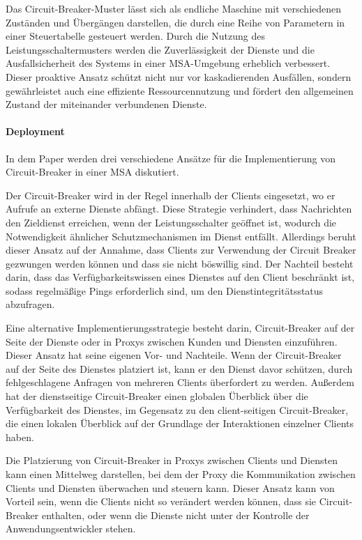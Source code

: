 Das Circuit-Breaker-Muster lässt sich als endliche Maschine mit verschiedenen Zuständen
und Übergängen darstellen, die durch eine Reihe von Parametern in einer Steuertabelle gesteuert werden.
Durch die Nutzung des Leistungsschaltermusters werden die Zuverlässigkeit der Dienste und die
Ausfallsicherheit des Systems in einer MSA-Umgebung erheblich verbessert.
Dieser proaktive Ansatz schützt nicht nur vor kaskadierenden Ausfällen,
sondern gewährleistet auch eine effiziente Ressourcennutzung und fördert den allgemeinen Zustand
der miteinander verbundenen Dienste.


\paragraph{Deployment}

In dem Paper werden drei verschiedene Ansätze für die Implementierung von Circuit-Breaker
in einer MSA diskutiert.

Der Circuit-Breaker wird in der Regel innerhalb der Clients eingesetzt,
wo er Aufrufe an externe Dienste abfängt.
Diese Strategie verhindert, dass Nachrichten den Zieldienst erreichen, wenn der
Leistungsschalter geöffnet ist, wodurch die Notwendigkeit ähnlicher
Schutzmechanismen im Dienst entfällt.
Allerdings beruht dieser Ansatz auf der Annahme, dass Clients zur Verwendung der Circuit Breaker
gezwungen werden können und dass sie nicht böswillig sind.
Der Nachteil besteht darin, dass das Verfügbarkeitswissen eines Dienstes auf den Client beschränkt ist,
sodass regelmäßige Pings erforderlich sind, um den Dienstintegritätsstatus abzufragen.

Eine alternative Implementierungsstrategie besteht darin,
Circuit-Breaker auf der Seite der Dienste oder in Proxys zwischen Kunden und Diensten einzuführen.
Dieser Ansatz hat seine eigenen Vor- und Nachteile.
Wenn der Circuit-Breaker auf der Seite des Dienstes platziert ist,
kann er den Dienst davor schützen, durch fehlgeschlagene Anfragen von mehreren Clients überfordert zu werden.
Außerdem hat der dienstseitige Circuit-Breaker einen globalen Überblick über die Verfügbarkeit des Dienstes,
im Gegensatz zu den client-seitigen Circuit-Breaker, die einen lokalen Überblick
auf der Grundlage der Interaktionen einzelner Clients haben.

Die Platzierung von Circuit-Breaker in Proxys zwischen Clients und Diensten
kann einen Mittelweg darstellen,
bei dem der Proxy die Kommunikation zwischen Clients und Diensten überwachen und steuern kann.
Dieser Ansatz kann von Vorteil sein, wenn die Clients nicht so verändert werden können,
dass sie Circuit-Breaker enthalten, oder wenn die Dienste nicht unter der Kontrolle der Anwendungsentwickler stehen.


